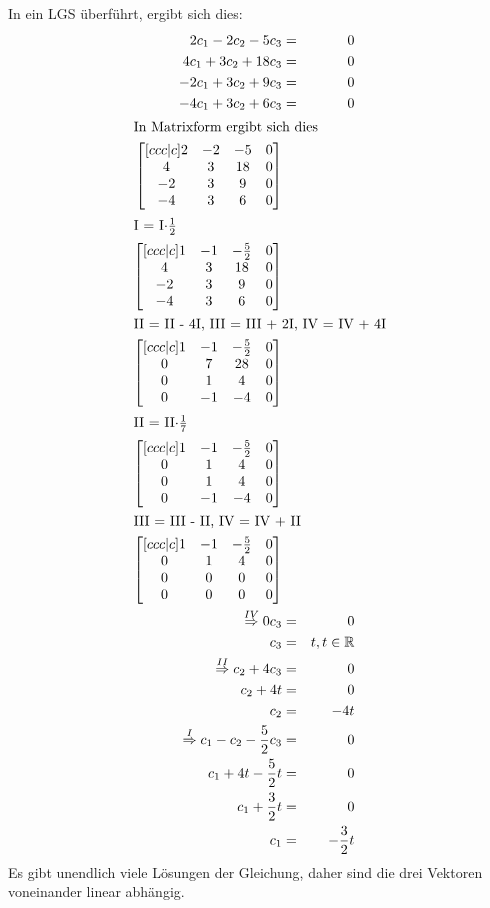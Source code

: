 \documentclass[10pt,a4paper,oneside,ngerman,numbers=noenddot]{scrartcl}
\begin{document}
In ein LGS überführt, ergibt sich dies:\\
\begin{alignat*}{2}
2c_{1} - 2c_{2} - 5c_{3} &=& 0 \\
4c_{1} + 3c_{2} + 18c_{3} &=& 0 \\
-2c_{1} + 3c_{2} + 9c_{3} &=& 0 \\
-4c_{1} + 3c_{2} + 6c_{3} &=& 0 \\
\intertext{In Matrixform ergibt sich dies}
\begin{bmatrix}[ccc|c]
2 & -2 & -5 & 0 \\
4 & 3 & 18 & 0 \\
-2 & 3 & 9 & 0 \\
-4 & 3 & 6 & 0
\end{bmatrix} \\
\intertext{I = I$ \cdot \frac{1}{2}$}
\begin{bmatrix}[ccc|c]
1 & -1 & -\frac{5}{2} & 0 \\
4 & 3 & 18 & 0 \\
-2 & 3 & 9 & 0 \\
-4 & 3 & 6 & 0
\end{bmatrix} \\
\intertext{II = II - 4I, III = III + 2I, IV = IV + 4I}
\begin{bmatrix}[ccc|c]
1 & -1 & -\frac{5}{2} & 0 \\
0 & 7 & 28 & 0 \\
0 & 1 & 4 & 0 \\
0 & -1 & -4 & 0
\end{bmatrix}  \\
\intertext{II = II$ \cdot \frac{1}{7}$}
\begin{bmatrix}[ccc|c]
1 & -1 & -\frac{5}{2} & 0 \\
0 & 1 & 4 & 0 \\
0 & 1 & 4 & 0 \\
0 & -1 & -4 & 0
\end{bmatrix} \\
\intertext{III = III - II, IV = IV + II}
\begin{bmatrix}[ccc|c]
1 & -1 & -\frac{5}{2} & 0 \\
0 & 1 & 4 & 0 \\
0 & 0 & 0 & 0 \\
0 & 0 & 0 & 0
\end{bmatrix} \\
\overset{IV}{\Rightarrow} 0c_{3} &=& 0 \\
c_{3} &=& t, t \in \mathbb{R} \\
\overset{II}{\Rightarrow} c_{2} + 4c_{3} &=& 0 \\
c_{2} + 4t &=& 0 \\
c_{2} &=& -4t \\
\overset{I}{\Rightarrow} c_{1} - c_{2} - \frac{5}{2}c_{3} &=& 0 \\
c_{1} + 4t - \frac{5}{2}t &=& 0 \\
c_{1} + \frac{3}{2}t &=& 0 \\
c_{1} &=& -\frac{3}{2}t
\end{alignat*}
Es gibt unendlich viele Lösungen der Gleichung, daher sind die drei Vektoren voneinander linear abhängig.
\end{document}
